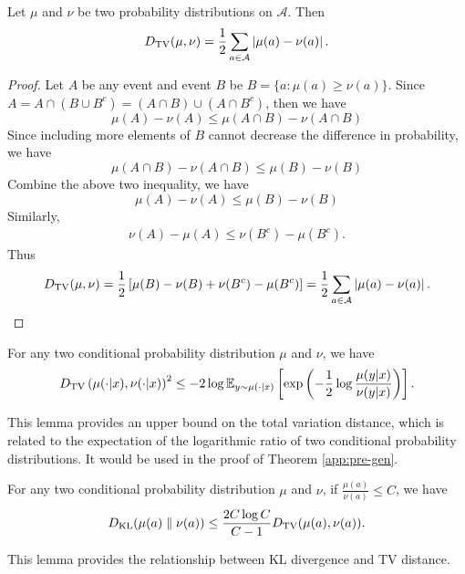\begin{proposition}\label{prop:TV-distance}
	Let $\mu$ and $\nu$ be two probability distributions on $\mathcal{A}$. Then
	$$
	D_{\mathrm{TV}}(\mu, \nu)=\frac{1}{2}\sum_{a\in\mathcal{A}}\left|\mu(a)-\nu(a)\right|.
	$$
\end{proposition}

\begin{proof}
	Let $A$ be any event and event $B$ be $B=\{a:\mu(a)\geq\nu(a)\}$. Since $A=A\cap(B\cup B^c)=(A \cap B)\cup (A \cap B^c) $, then we have
	\begin{equation*}\label{mu-1}
		\mu(A)-\nu(A)\leq\mu(A\cap B)-\nu(A\cap B)
	\end{equation*}
	Since including more elements of $B$ cannot decrease the difference in probability, we have
	\begin{equation*}\label{mu-2}
		\mu(A\cap B)-\nu(A\cap B)\leq\mu(B)-\nu(B)
	\end{equation*}
	Combine the above two inequality, we have
	\begin{equation*}\label{mu-3}
		\mu(A)-\nu(A)\leq\mu(B)-\nu(B)
	\end{equation*}
	Similarly,
	$$
	\begin{aligned}\label{nu}
		\nu(A)-\mu(A)\leq\nu(B^{c})-\mu(B^{c}).
	\end{aligned}
	$$
	Thus
	$$
	D_{\mathrm{TV}}(\mu,\nu)=\frac{1}{2}\left[\mu(B)-\nu(B)+\nu(B^{c})-\mu(B^{c})\right]=\frac{1}{2}\sum_{a\in\mathcal{A}}\left|\mu(a)-\nu(a)\right|.
	$$
\end{proof}

\begin{lemma}\label{lemma:TV} For any two conditional probability distribution $\mu$ and $\nu$, we have
	$$
	D_{\mathrm{TV}}\left(\mu(\cdot | x), \nu(\cdot | x)\right)^2 \leq-2\log\mathbb{E}_{y\sim \mu(\cdot|x)}\left[\exp\left(-\frac{1}{2}\log \frac{\mu(y|x)}{\nu(y|x)}\right)\right].
	$$
\end{lemma}

This lemma provides an upper bound on the total variation distance, which is related to the expectation of the logarithmic ratio of two conditional probability distributions. It would be used in the proof of Theorem \ref{app:pre-gen}.

\begin{lemma}\label{lemma:KL-TV-bound} For any two conditional probability distribution $\mu$ and $\nu$, if $\frac{\mu(a)}{\nu(a)} \leq C$, we have
	$$
	D_{\mathrm{KL}}(\mu(a) \parallel \nu(a)) \leq \frac{2C\log C}{C-1}D_{\mathrm{TV}}(\mu(a),\nu(a)).
	$$
\end{lemma}
This lemma provides the relationship between KL divergence and TV distance.

